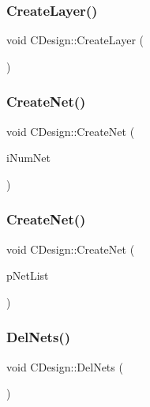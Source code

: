 \subsubsection{\texorpdfstring{CreateLayer()}{CreateLayer()}}
{\footnotesize\ttfamily void C\+Design\+::\+Create\+Layer (\begin{DoxyParamCaption}{ }\end{DoxyParamCaption})}

\mbox{\label{classCDesign_a844b18267aad1895dc66e3208b36d21b}} 
\subsubsection{\texorpdfstring{CreateNet()}{CreateNet()}\hspace{0.1cm}{\footnotesize\ttfamily [1/2]}}
{\footnotesize\ttfamily void C\+Design\+::\+Create\+Net (\begin{DoxyParamCaption}\item[{int}]{i\+Num\+Net }\end{DoxyParamCaption})}

\mbox{\label{classCDesign_a961dbd6912b3ef52ff673b60342f51a6}} 
\subsubsection{\texorpdfstring{CreateNet()}{CreateNet()}\hspace{0.1cm}{\footnotesize\ttfamily [2/2]}}
{\footnotesize\ttfamily void C\+Design\+::\+Create\+Net (\begin{DoxyParamCaption}\item[{vector$<$ \mbox{\hyperlink{classCNet}{C\+Net}} $\ast$ $>$ $\ast$}]{p\+Net\+List }\end{DoxyParamCaption})}

\mbox{\label{classCDesign_a02442687ac58142d9e5b0a5886ee8285}} 
\subsubsection{\texorpdfstring{DelNets()}{DelNets()}}
{\footnotesize\ttfamily void C\+Design\+::\+Del\+Nets (\begin{DoxyParamCaption}{ }\end{DoxyParamCaption})}


